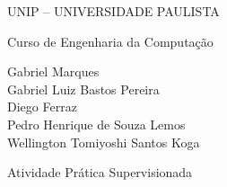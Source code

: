 \documentclass[
  12pt, oneside, a4paper,
  english, brazil,
  sumario=tradicional
]{abntex2}
\begin{document}
\frenchspacing

\pretextual

\renewcommand{\imprimircapa}{%
  \begin{capa}%
    \center
    {\ABNTEXchapterfont\large\MakeUppercase{UNIP -- Universidade Paulista}}
    \vspace*{0.6cm}

    {\large Curso de Engenharia da Computação}
    \vspace*{1.6cm}

    {\large Gabriel Marques\\Gabriel Luiz Bastos Pereira\\Diego Ferraz\\Pedro Henrique de Souza Lemos\\Wellington Tomiyoshi Santos Koga\par}
    \vfill
    \begin{center}
      \ABNTEXchapterfont\bfseries\Large\imprimirtitulo
    \end{center}
    \vspace*{0.8cm}

    {\large Atividade Prática Supervisionada}
    \vfill
    \large\imprimirlocal\par
    \large\imprimirdata
    \vspace*{1cm}
  \end{capa}}
\imprimircapa

\imprimirfolhaderosto



\tableofcontents*
\cleardoublepage

\textual











\postextual
\printbibliography[title=Referências]
\end{document}
